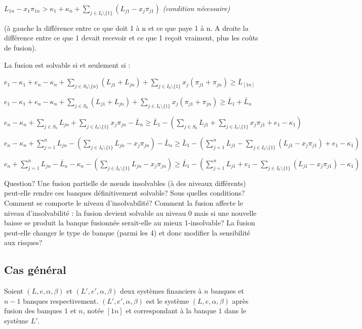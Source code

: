 \documentclass{article}
\begin{document}
$L_{1n} - x_{1} \pi_{1n}> \kappa_{1} + \kappa_{n} + \sum_{j \in I_{0}\setminus \lbrace 1 \rbrace} (L_{j1} - x_{j} \pi_{j1})  $ \textit{(condition nécessaire)}

(à gauche la différence entre ce que doit 1 à n et ce que paye 1 à n. A droite la différence entre ce que 1 devait recevoir et ce que 1 reçoit vraiment, plus les coûts de fusion).


La fusion est solvable si et seulement si :

$e_{1} - \kappa_{1} + e_{n} - \kappa_{n} + \sum_{j \in S_{0}\setminus \lbrace n \rbrace} (L_{j1} + L_{jn}) + \sum_{j \in I_{0}\setminus \lbrace 1 \rbrace} x_{j}(\pi_{j1} + \pi_{jn}) \geq \bar L_{\left[1n \right]}$

$e_{1} - \kappa_{1} + e_{n} - \kappa_{n} + \sum_{j \in S_{0}} (L_{j1} + L_{jn}) + \sum_{j \in I_{0}\setminus \lbrace 1 \rbrace} x_{j}(\pi_{j1} + \pi_{jn}) \geq \bar L_{1} + \bar L_{n}$

$ e_{n} - \kappa_{n} + \sum_{j \in S_{0}} L_{jn} + \sum_{j \in I_{0}\setminus \lbrace 1 \rbrace} x_{j}\pi_{jn} - \bar L_{n} \geq \bar L_{1}  - (\sum_{j \in S_{0}} L_{j1} + \sum_{j \in I_{0}\setminus \lbrace 1 \rbrace} x_{j}\pi_{j1} + e_{1} - \kappa_{1})$

$ e_{n} - \kappa_{n} + \sum_{j=1}^{n} L_{jn} - (\sum_{j \in I_{0}\setminus \lbrace 1 \rbrace} L_{jn} - x_{j}\pi_{jn}) - \bar L_{n} \geq \bar L_{1}  - (\sum_{j=1}^{n} L_{j1} - \sum_{j \in I_{0}\setminus \lbrace 1 \rbrace} (L_{j1} - x_{j}\pi_{j1})  + e_{1} - \kappa_{1})$

$ e_{n}  + \sum_{j=1}^{n} L_{jn} - \bar L_{n}- \kappa_{n} - (\sum_{j \in I_{0}\setminus \lbrace 1 \rbrace} L_{jn} - x_{j}\pi_{jn})  \geq \bar L_{1}  - (\sum_{j=1}^{n} L_{j1} + e_{1} - \sum_{j \in I_{0}\setminus \lbrace 1 \rbrace} (L_{j1} - x_{j}\pi_{j1})   - \kappa_{1})$

Question? Une fusion partielle de nœuds insolvables (à des niveaux différents) peut-elle rendre ces banques définitivement solvable? Sous quelles conditions? Comment se comporte le niveau d'insolvabilité? Comment la fusion affecte le niveau d'insolvabilité : la fusion devient solvable au niveau 0 mais si une nouvelle baisse se produit la banque fusionnée serait-elle au mieux 1-insolvable? La fusion peut-elle changer le type de banque (parmi les 4) et donc modifier la sensibilité aux risques?

\subsection{Cas général}
Soient $(L, e, \alpha, \beta)$ et $(L', e', \alpha, \beta)$ deux systèmes financiers à $n$ banques et $n-1$ banques respectivement. $(L', e', \alpha, \beta)$ est le système $(L, e, \alpha, \beta)$ après fusion des banques $1$ et $n$, notée $\left[1n \right]$ et correspondant à la banque $1$ dans le système $L'$.
\end{document}
